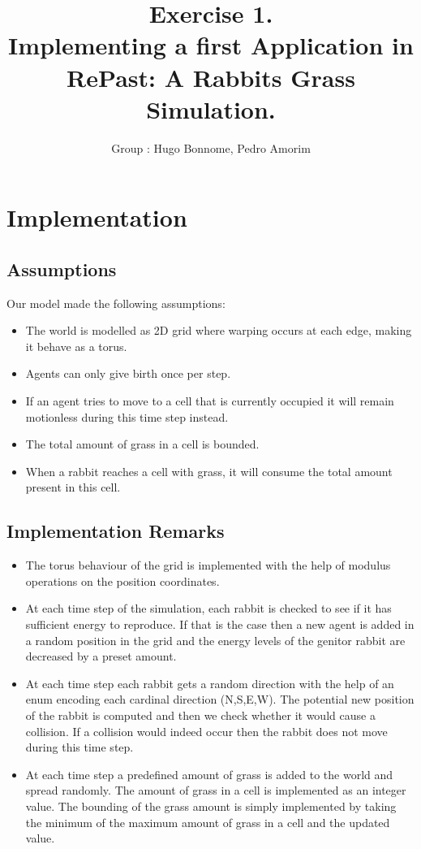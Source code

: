 \documentclass[11pt]{article}
\title{\bf Exercise 1.\\ Implementing a first Application in RePast: A Rabbits Grass Simulation.}
\author{Group \textnumero: Hugo Bonnome, Pedro Amorim}
\begin{document}
\maketitle

\section{Implementation}

\subsection{Assumptions}
Our model made the following assumptions:
\begin{itemize}
\item The world is modelled as 2D grid where warping occurs at each edge, making
  it behave as a torus.
\item Agents can only give birth once per step.
\item If an agent tries to move to a cell that is currently occupied it will
  remain motionless during this time step instead.
\item The total amount of grass in a cell is bounded.
\item When a rabbit reaches a cell with grass, it will consume the total amount present in this cell.
\end{itemize}

\subsection{Implementation Remarks}
\begin{itemize}
\item The torus behaviour of the grid is implemented with the help of modulus
  operations on the position coordinates.
\item At each time step of the simulation, each rabbit is checked to see if
  it has sufficient energy to reproduce. If that is the case then a new
  agent is added in a random position in the grid and the energy levels of
  the genitor rabbit are decreased by a preset amount.
\item At each time step each rabbit gets a random direction with the help of an
  enum encoding each cardinal direction (N,S,E,W). The potential new position of
  the rabbit is computed and then we check whether it would cause a collision.
  If a collision would indeed occur then the rabbit does not move during this
  time step.
\item At each time step a predefined amount of grass is added to the world and
  spread randomly. The amount of grass in a cell is implemented as an integer
  value. The bounding of the grass amount is simply implemented by taking the
  minimum of the maximum amount of grass in a cell and the updated value.
\end{itemize}
  
\end{document}
